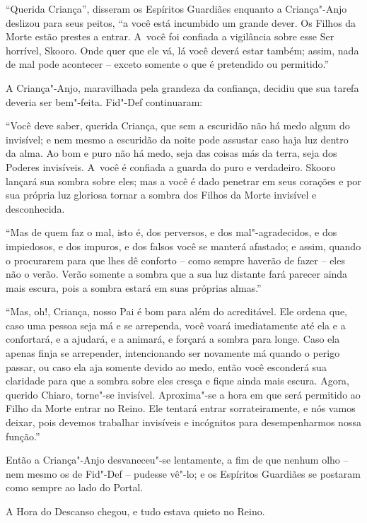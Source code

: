 ``Querida Criança'', disseram os Espíritos Guardiães enquanto a
Criança"-Anjo deslizou para seus peitos, ``a você está incumbido um
grande dever. Os Filhos da Morte estão prestes a entrar. A~você foi
confiada a vigilância sobre esse Ser horrível, Skooro. Onde quer que ele vá,
lá você deverá estar também; assim, nada de mal pode acontecer -- exceto
somente o que é pretendido ou permitido.''

A Criança"-Anjo, maravilhada pela grandeza da confiança, decidiu que sua
tarefa deveria ser bem"-feita. Fid"-Def continuaram:

``Você deve saber, querida Criança, que sem a escuridão não há medo
algum do invisível; e nem mesmo a escuridão da noite pode assustar caso
haja luz dentro da alma. Ao bom e puro não há medo, seja das coisas más
da terra, seja dos Poderes invisíveis. A~você é confiada a guarda do
puro e verdadeiro. Skooro lançará sua sombra sobre eles; mas a você é
dado penetrar em seus corações e por sua própria luz gloriosa tornar a
sombra dos Filhos da Morte invisível e desconhecida.

``Mas de quem faz o mal, isto é, dos perversos, e dos mal"-agradecidos, e
dos impiedosos, e dos impuros, e dos falsos você se manterá afastado; e
assim, quando o procurarem para que lhes dê conforto -- como sempre
haverão de fazer -- eles não o verão. Verão somente a sombra que a sua
luz distante fará parecer ainda mais escura, pois a sombra estará em
suas próprias almas.''

``Mas, oh!, Criança, nosso Pai é bom para além do acreditável. Ele ordena
que, caso uma pessoa seja má e se arrependa, você voará imediatamente até
ela e a confortará, e a ajudará, e a animará, e forçará a sombra para
longe. Caso ela apenas finja se arrepender, intencionando ser novamente
má quando o perigo passar, ou caso ela aja somente devido ao medo,
então você esconderá sua claridade para que a sombra sobre eles cresça e
fique ainda mais escura. Agora, querido Chiaro, torne"-se invisível.
Aproxima"-se a hora em que será permitido ao Filho da Morte entrar no
Reino. Ele tentará entrar sorrateiramente, e nós vamos deixar, pois
devemos trabalhar invisíveis e incógnitos para desempenharmos nossa
função.''

Então a Criança"-Anjo desvaneceu"-se lentamente, a fim de que nenhum olho
-- nem mesmo os de Fid"-Def -- pudesse vê"-lo; e os Espíritos Guardiães se
postaram como sempre ao lado do Portal.

A Hora do Descanso chegou, e tudo estava quieto no Reino.

